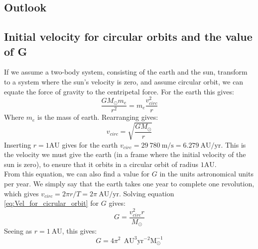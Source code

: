 \documentclass[a4paper, 10pt]{article}
\begin{document}
\subsection{Outlook}
\begin{appendices}
\section{Initial velocity for circular orbits and the value of G}\label{ap:Find_Circular_orbit}
If we assume a two-body system, consisting of the earth and the sun, transform to a system where the sun's velocity is zero, and assume circular orbit, we can equate the force of gravity to the centripetal force. For the earth this gives:
$$\frac{GM_{\odot}m_e}{r^2}=m_e\frac{v_{circ}^2}{r}$$
Where $m_e$ is the mass of earth. Rearranging gives:
\begin{equation}\label{eq:Vel_for_cicrular_orbit}
v_{circ}=\sqrt{\frac{GM_{\odot}}{r}}
\end{equation}
Inserting $r=1 \mathrm{AU}$ gives for the earth $v_{circ}=29\ 780 \ \mathrm{m/s}=6.279 \ \mathrm{AU/yr}$. This is the velocity we must give the earth (in a frame where the initial velocity of the sun is zero), to ensure that it orbits in a circular orbit of radius $1 \mathrm{AU}$.\\
\linebreak
From this equation, we can also find a value for $G$ in the units astronomical units per year. We simply say that the earth takes one year to complete one revolution, which gives $v_{circ}=2\pi r/T=2\pi \ \mathrm{AU/yr}$. Solving equation \ref{eq:Vel_for_cicrular_orbit} for $G$ gives:
$$G=\frac{v_{circ}^2 r}{M_{\odot}}$$
Seeing as  $r=1 \ \mathrm{AU}$, this gives:
$$G=4\pi^2\ \ \mathrm{AU^3}\mathrm{yr^{-2}M_{\odot}^{-1}}$$

\end{appendices}
\end{document}
